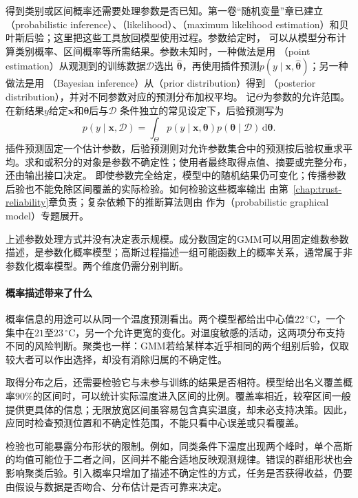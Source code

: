 得到类别或区间概率还需要处理参数是否已知。第一卷“随机变量”章已建立（probabilistic inference）、（likelihood）、（maximum likelihood estimation）和贝叶斯后验；这里把这些工具放回模型使用过程。参数给定时，
可以从模型分布计算类别概率、区间概率等所需结果。参数未知时，一种做法是用
（point estimation）从观测到的训练数据$\mathcal D$选出
$\hat{\bm{\theta}}$，再使用插件预测$p(y\mid\bm x,\hat{\bm{\theta}})$；另一种做法是用
（Bayesian inference）从（prior distribution）得到
（posterior distribution），并对不同参数对应的预测分布加权平均。
记$\Theta$为参数的允许范围。在新结果$y$给定$\bm x$和$\bm\theta$后与$\mathcal D$
条件独立的常见设定下，后验预测写为
\[
  p(y\mid\bm x,\mathcal D)
  =\int_{\Theta} p(y\mid\bm x,\bm\theta)
    p(\bm\theta\mid\mathcal D)\,\mathrm d\bm\theta.
\]
插件预测固定一个估计参数，后验预测则对允许参数集合中的预测按后验权重求平均。求和或积分的对象是参数不确定性；使用者最终取得点值、摘要或完整分布，还由输出接口决定。
即使参数完全给定，模型中的随机结果仍可变化；传播参数后验也不能免除区间覆盖的实际检验。如何检验这些概率输出
由第~\ref{chap:trust-reliability}章负责；复杂依赖下的推断算法则由
作为（probabilistic graphical model）专题展开。

上述参数处理方式并没有决定表示规模。成分数固定的GMM可以用固定维数参数描述，是参数化概率模型；高斯过程描述一组可能函数上的概率关系，通常属于非参数化概率模型。两个维度仍需分别判断。

\paragraph{概率描述带来了什么}

概率信息的用途可以从同一个温度预测看出。两个模型都给出中心值$22\,^{\circ}\mathrm{C}$，一个集中在$21$至$23\,^{\circ}\mathrm{C}$，另一个允许更宽的变化。对温度敏感的活动，这两项分布支持不同的风险判断。聚类也一样：GMM若给某样本近乎相同的两个组别后验，仅取较大者可以作出选择，却没有消除归属的不确定性。

取得分布之后，还需要检验它与未参与训练的结果是否相符。模型给出名义覆盖概率$90\%$的区间时，可以统计实际温度进入区间的比例。覆盖率相近，较窄区间一般提供更具体的信息；无限放宽区间虽容易包含真实温度，却未必支持决策。因此，应同时检查预测位置和不确定性范围，不能只看中心误差或只看覆盖。

检验也可能暴露分布形状的限制。例如，同类条件下温度出现两个峰时，单个高斯的均值可能位于二者之间，区间并不能合适地反映观测规律。错误的群组形状也会影响聚类后验。引入概率只增加了描述不确定性的方式，任务是否获得收益，仍要由假设与数据是否吻合、分布估计是否可靠来决定。

